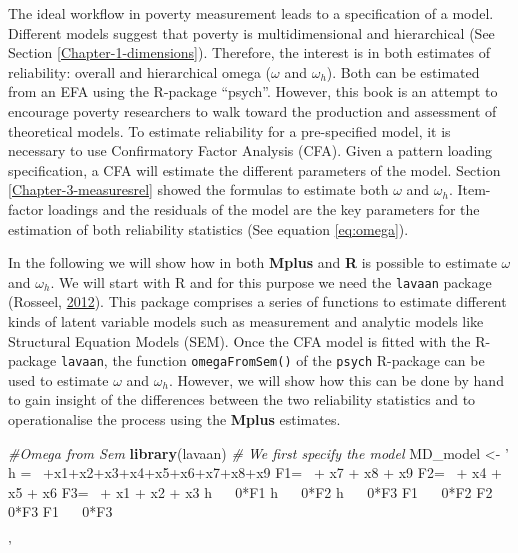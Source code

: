 \documentclass[]{book}
\newenvironment{Shaded}{\begin{snugshade}}{\end{snugshade}}
\newcommand{\CommentTok}[1]{\textcolor[rgb]{0.56,0.35,0.01}{\textit{#1}}}
\newcommand{\KeywordTok}[1]{\textcolor[rgb]{0.13,0.29,0.53}{\textbf{#1}}}
\newcommand{\NormalTok}[1]{#1}
\newcommand{\StringTok}[1]{\textcolor[rgb]{0.31,0.60,0.02}{#1}}
\begin{document}
The ideal workflow in poverty measurement leads to a specification of a model. Different models suggest that poverty is multidimensional and hierarchical (See Section \ref{Chapter-1-dimensions}). Therefore, the interest is in both estimates of reliability: overall and hierarchical omega (\(\omega\) and \(\omega_h\)). Both can be estimated from an EFA using the R-package ``psych''. However, this book is an attempt to encourage poverty researchers to walk toward the production and assessment of theoretical models. To estimate reliability for a pre-specified model, it is necessary to use Confirmatory Factor Analysis (CFA). Given a pattern loading specification, a CFA will estimate the different parameters of the model. Section \ref{Chapter-3-measuresrel} showed the formulas to estimate both \(\omega\) and \(\omega_h\). Item-factor loadings and the residuals of the model are the key parameters for the estimation of both reliability statistics (See equation \eqref{eq:omega}).

In the following we will show how in both \textbf{Mplus} and \textbf{R} is possible to estimate \(\omega\) and \(\omega_h\). We will start with R and for this purpose we need the \texttt{lavaan} package (Rosseel, \protect\hyperlink{ref-Rosseel2012}{2012}). This package comprises a series of functions to estimate different kinds of latent variable models such as measurement and analytic models like Structural Equation Models (SEM). Once the CFA model is fitted with the R-package \texttt{lavaan}, the function \texttt{omegaFromSem()} of the \texttt{psych} R-package can be used to estimate \(\omega\) and \(\omega_h\). However, we will show how this can be done by hand to gain insight of the differences between the two reliability statistics and to operationalise the process using the \textbf{Mplus} estimates.

\begin{Shaded}
\begin{Highlighting}[]
\CommentTok{#Omega from Sem}
\KeywordTok{library}\NormalTok{(lavaan)}
\CommentTok{# We first specify the model}
\NormalTok{MD_model <-}\StringTok{ ' h =~ +x1+x2+x3+x4+x5+x6+x7+x8+x9 }
\StringTok{                F1=~  + x7 + x8 + x9        }
\StringTok{                F2=~  + x4 + x5 + x6         }
\StringTok{                F3=~  + x1 + x2 + x3}
\StringTok{                h  ~~ 0*F1}
\StringTok{                h  ~~ 0*F2}
\StringTok{                h  ~~ 0*F3}
\StringTok{                F1 ~~ 0*F2}
\StringTok{                F2 ~~ 0*F3}
\StringTok{                F1 ~~ 0*F3}

\StringTok{'}
\end{Highlighting}
\end{Shaded}
\end{document}
